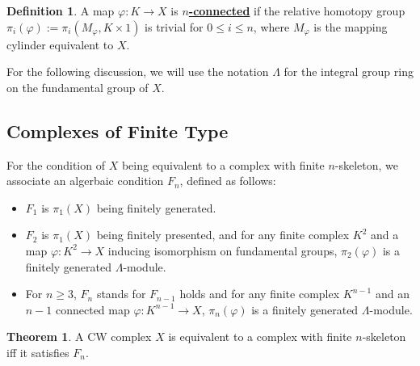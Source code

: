 \documentclass{article}
\theoremstyle{definition}
\newtheorem{theorem}{Theorem}[section]
\theoremstyle{definition}
\newtheorem{definition}{Definition}[theorem]
\theoremstyle{definition}
\theoremstyle{definition}
\theoremstyle{definition}
\theoremstyle{definition}
\theoremstyle{definition}
\begin{document}
\begin{tcolorbox}[colback=purple!5!white,colframe=purple!75!black]
\begin{definition}
A map $\varphi: K\to X$ is $n$\underline{\textbf{-connected}} if the relative homotopy group $\pi_i(\varphi):= \pi_i(M_{\varphi},K\times 1)$ is trivial for $0\leq i\leq n$, where $M_{\varphi}$ is the mapping cylinder equivalent to $X$.
\end{definition}
\end{tcolorbox}

For the following discussion, we will use the notation $\Lambda$ for the integral group ring on the fundamental group of $X$.
\subsection{Complexes of Finite Type}
For the condition of $X$ being equivalent to a complex with finite $n$-skeleton, we associate an algerbaic condition $F_n$, defined as follows: 

\begin{itemize}
    \item $F_1$ is $\pi_1(X)$ being finitely generated.
    \item $F_2$ is $\pi_1(X)$ being finitely presented, and for any finite complex $K^2$ and a map $\varphi: K^2\to X$ inducing isomorphism on fundamental groups, $\pi_2(\varphi)$ is a finitely generated $\Lambda$-module. 
    \item  For $n\geq 3$, $F_n$ stands for $F_{n-1}$ holds and for any finite complex $K^{n-1}$ and an $n-1$ connected map $\varphi: K^{n-1}\to X$, $\pi_n(\varphi)$ is a finitely generated $\Lambda$-module.
\end{itemize}


\begin{tcolorbox}[colback=red!5!white,colframe=red!30!white]
\begin{theorem}
A CW complex $X$ is equivalent to a complex with finite $n$-skeleton iff it satisfies $F_n$.
\end{theorem}
\end{tcolorbox}
\end{document}
